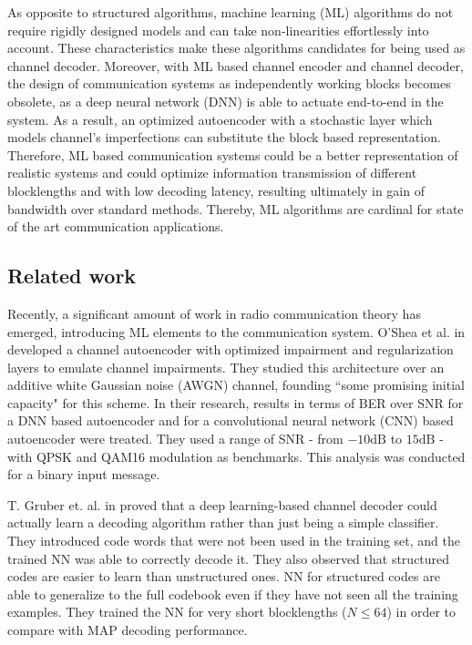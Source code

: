 \documentclass[conference]{IEEEtran}
\begin{document}
As opposite to structured algorithms, machine learning (ML) algorithms do not require rigidly designed models and can take non-linearities effortlessly into account. These characteristics make these algorithms candidates for being used as channel decoder. Moreover, with ML based channel encoder and channel decoder, the design of communication systems as independently working blocks becomes obsolete, as a deep neural network (DNN) is able to actuate end-to-end in the system. As a result, an optimized autoencoder with a stochastic layer which models channel's imperfections can substitute the block based representation. Therefore, ML based communication systems could be a better representation of realistic systems and could optimize information transmission of different blocklengths and with low decoding latency, resulting ultimately in gain of bandwidth over standard methods. Thereby, ML algorithms are cardinal for state of the art communication applications. 

\subsection{Related work}

Recently, a significant amount of work in radio communication theory has emerged, introducing ML elements to the communication system. O'Shea et al. in \cite{2016arXiv160806409O} developed a channel autoencoder with optimized impairment and regularization layers to emulate channel impairments. They studied this architecture over an additive white Gaussian noise (AWGN) channel, founding ``some promising initial capacity" for this scheme. In their research, results in terms of BER over SNR for a DNN based autoencoder and for a convolutional neural network (CNN) based autoencoder were treated. They used a range of SNR - from $-10 \text{dB}$ to $15 \text{dB}$ - with QPSK and QAM16 modulation as benchmarks. This analysis was conducted for a binary input message.

    
T. Gruber et. al. in \cite{2017arXiv171008379G} proved that a deep learning-based channel decoder could actually learn a decoding algorithm rather than just being a simple classifier. They introduced code words that were not been used in the training set, and the trained NN was able to correctly decode it. They also observed that structured codes are easier to learn than unstructured ones. NN for structured codes are able to generalize to the full codebook even if they have not seen all the training examples. They trained the NN for very short blocklengths ($N \leq 64$) in order to compare with MAP decoding performance.
\end{document}
